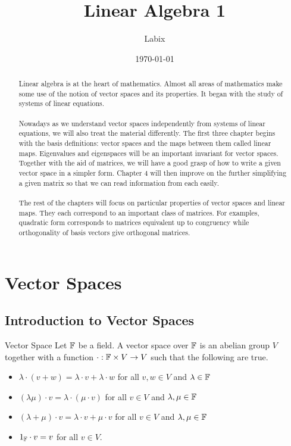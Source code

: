 \documentclass[a4paper]{article}
\title{Linear Algebra 1}
\author{Labix}
\date{\today}
\begin{document}
\maketitle
\begin{abstract}
Linear algebra is at the heart of mathematics. Almost all areas of mathematics make some use of the notion of vector spaces and its properties. It began with the study of systems of linear equations. \\~\\

Nowadays as we understand vector spaces independently from systems of linear equations, we will also treat the material differently. The first three chapter begins with the basis definitions: vector spaces and the maps between them called linear maps. Eigenvalues and eigenspaces will be an important invariant for vector spaces. Together with the aid of matrices, we will have a good grasp of how to write a given vector space in a simpler form. Chapter 4 will then improve on the further simplifying a given matrix so that we can read information from each easily. \\~\\

The rest of the chapters will focus on particular properties of vector spaces and linear maps. They each correspond to an important class of matrices. For examples, quadratic form corresponds to matrices equivalent up to congruency while orthogonality of basis vectors give orthogonal matrices. 
\end{abstract}
\pagebreak
\tableofcontents
\pagebreak

\section{Vector Spaces}
\subsection{Introduction to Vector Spaces}
\begin{defn}{Vector Space}{} Let $\mathbb{F}$ be a field. A vector space over $\mathbb{F}$ is an abelian group $V$ together with a function $\cdot:\mathbb{F}\times V\to V$ such that the following are true. 
\begin{itemize}
\item $\lambda\cdot(v+w)=\lambda\cdot v+\lambda\cdot w$ for all $v,w\in V$ and $\lambda\in\mathbb{F}$
\item $(\lambda\mu)\cdot v=\lambda\cdot(\mu\cdot v)$ for all $v\in V$ and $\lambda,\mu\in\mathbb{F}$
\item $(\lambda+\mu)\cdot v=\lambda\cdot v+\mu\cdot v$ for all $v\in V$ and $\lambda,\mu\in\mathbb{F}$
\item $1_{\mathbb{F}}\cdot v=v$ for all $v\in V$. 
\end{itemize}
\end{defn}
\end{document}
